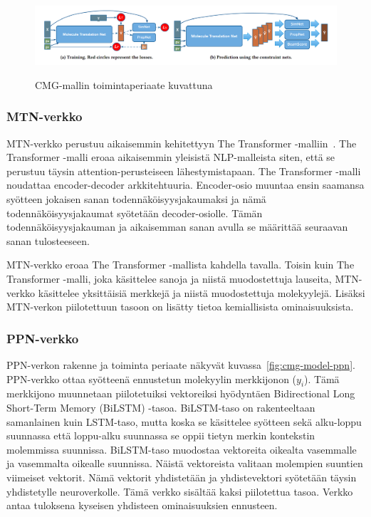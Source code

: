 \documentclass[finnish,twoside,censored,tkt,sw-line]{HYthesisML}
\begin{document}
\begin{figure}[!ht]
    \centering
    \includegraphics[width=\textwidth]{CMG-fig.png}
    \caption{CMG-mallin toimintaperiaate kuvattuna}
    {\cite{ShinBonggun}}
    {\label{fig:cmg-model-whole}}
\end{figure}

\subsubsection{MTN-verkko}

MTN-verkko perustuu aikaisemmin kehitettyyn The Transformer -malliin~\cite{TheTransformer}.
The Transformer -malli eroaa aikaisemmin yleisistä NLP-malleista siten, että se perustuu täysin attention-perusteiseen lähestymistapaan.
The Transformer -malli noudattaa encoder-decoder arkkitehtuuria.
Encoder-osio muuntaa ensin saamansa syötteen jokaisen sanan todennäköisyysjakaumaksi ja nämä todennäköisyysjakaumat syötetään decoder-osiolle.
Tämän todennäköisyysjakauman ja aikaisemman sanan avulla se määrittää seuraavan sanan tulosteeseen.

MTN-verkko eroaa The Transformer -mallista kahdella tavalla.
Toisin kuin The Transformer -malli, joka käsittelee sanoja ja niistä muodostettuja lauseita, MTN-verkko käsittelee yksittäisiä merkkejä ja niistä muodostettuja molekyylejä.
Lisäksi MTN-verkon piilotettuun tasoon on lisätty tietoa kemiallisista ominaisuuksista.

\subsubsection{PPN-verkko}

PPN-verkon rakenne ja toiminta periaate näkyvät kuvassa~\ref{fig:cmg-model-ppn}.
PPN-verkko ottaa syötteenä ennustetun molekyylin merkkijonon (\(y_i\)).
Tämä merkkijono muunnetaan piilotetuiksi vektoreiksi hyödyntäen Bidirectional Long Short-Term Memory (BiLSTM) -tasoa.
BiLSTM-taso on rakenteeltaan samanlainen kuin LSTM-taso, mutta koska se käsittelee syötteen sekä alku-loppu suunnassa että loppu-alku suunnassa se oppii tietyn merkin kontekstin molemmissa suunnissa.
BiLSTM-taso muodostaa vektoreita oikealta vasemmalle ja vasemmalta oikealle suunnissa.
Näistä vektoreista valitaan molempien suuntien viimeiset vektorit.
Nämä vektorit yhdistetään ja yhdistevektori syötetään täysin yhdistetylle neuroverkolle.
Tämä verkko sisältää kaksi piilotettua tasoa.
Verkko antaa tuloksena kyseisen yhdisteen ominaisuuksien ennusteen.
\end{document}
